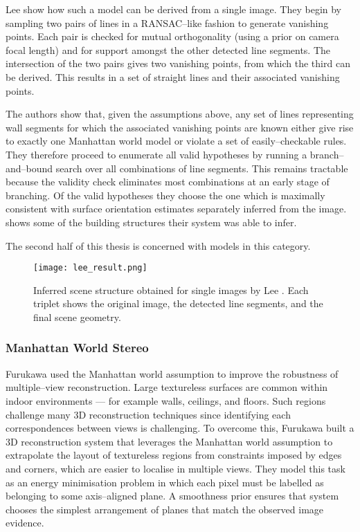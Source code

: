 Lee \etal show how such a model can be derived from a single
image. They begin by sampling two pairs of lines in a RANSAC--like
fashion to generate vanishing points. Each pair is checked for mutual
orthogonality (using a prior on camera focal length) and for support
amongst the other detected line segments. The intersection of the two
pairs gives two vanishing points, from which the third can be
derived. This results in a set of straight lines and their associated
vanishing points.

The authors show that, given the assumptions above, any set of lines
representing wall segments for which the associated vanishing points
are known either give rise to exactly one Manhattan world model or
violate a set of easily--checkable rules. They therefore proceed to
enumerate all valid hypotheses by running a branch--and--bound search
over all combinations of line segments. This remains tractable because
the validity check eliminates most combinations at an early stage of
branching. Of the valid hypotheses they choose the one which is
maximally consistent with surface orientation estimates separately
inferred from the image.  shows some of the
building structures their system was able to infer.

The second half of this thesis is concerned with models in this
category.

\begin{figure}[tb]
  \centering
  \texttt{[image: lee\_result.png]}
  \caption{Inferred scene structure obtained for single images by Lee
    \etal \cite{Lee09}. Each triplet shows the original image, the
    detected line segments, and the final scene geometry.}
  \label{fig:lee-result}
\end{figure}

\subsubsection{Manhattan World Stereo}

Furukawa \etal \cite{Furukawa09} used the Manhattan world assumption
to improve the robustness of multiple--view reconstruction. Large
textureless surfaces are common within indoor environments --- for
example walls, ceilings, and floors. Such regions challenge many 3D
reconstruction techniques since identifying each correspondences
between views is challenging. To overcome this, Furukawa \etal built a
3D reconstruction system that leverages the Manhattan world assumption
to extrapolate the layout of textureless regions from constraints
imposed by edges and corners, which are easier to localise in multiple
views. They model this task as an energy minimisation problem in which
each pixel must be labelled as belonging to some axis--aligned
plane. A smoothness prior ensures that system chooses the simplest
arrangement of planes that match the observed image evidence.

